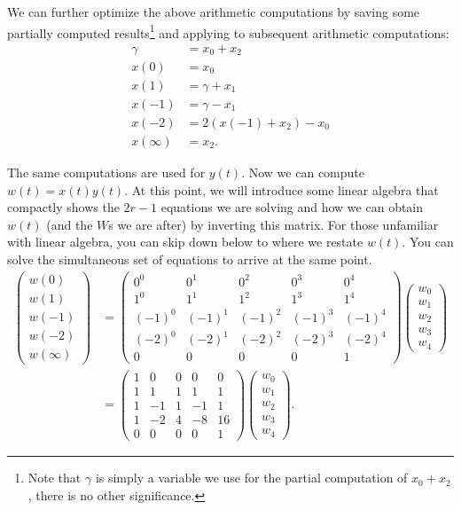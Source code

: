 \documentclass[psamsfonts,reqno]{amsart}
\theoremstyle{definition}
\theoremstyle{remark}
\numberwithin{equation}{section}
\begin{document}
We can further optimize the above arithmetic computations by saving some partially computed results\footnote{Note that $\gamma$ is simply a variable we use for the partial computation of $x_0 + x_2$, there is no other significance.} and applying to subsequent arithmetic computations:
\begin{align}
	\gamma &= x_0 + x_2 \label{toom_opt1} \\
	x(0) &= x_0 \label{toom_opt2} \\
	x(1) &= \gamma + x_1 \label{toom_opt3} \\
	x(-1) &= \gamma - x_1 \label{toom_opt4} \\
	x(-2) &= 2(x(-1) + x_2) - x_0 \label{toom_opt5} \\
	x(\infty) &= x_2. \label{toom_opt6}
\end{align}

The same computations are used for $y(t)$. Now we can compute $w(t) = x(t)y(t)$. At this point, we will introduce some linear algebra that compactly shows the $2r-1$ equations we are solving and how we can obtain $w(t)$ (and the $W$s we are after) by inverting this matrix. For those unfamiliar with linear algebra, you can skip down below to where we restate $w(t)$. You can solve the simultaneous set of equations to arrive at the same point.
\begin{align*}
	\begin{pmatrix}
		w(0) \\ 
		w(1) \\
		w(-1) \\
		w(-2) \\
		w(\infty)
	\end{pmatrix}
	&=
	\begin{pmatrix}
		0^0 & 0^1 & 0^2 & 0^3 & 0^4 \\
		1^0 & 1^1 & 1^2 & 1^3 & 1^4 \\
		(-1)^0 & (-1)^1 & (-1)^2 & (-1)^3 & (-1)^4 \\
		(-2)^0 & (-2)^1 & (-2)^2 & (-2)^3 & (-2)^4 \\
		0 & 0 & 0 & 0 & 1
	\end{pmatrix}
	\begin{pmatrix}
		w_0 \\
		w_1 \\
		w_2 \\
		w_3 \\
		w_4
	\end{pmatrix}
	\\
	&=
	\begin{pmatrix}
		1 & 0 & 0 & 0 & 0 \\
		1 & 1 & 1 & 1 & 1 \\
		1 & -1 & 1 & -1 & 1 \\
		1 & -2 & 4 & -8 & 16 \\
		0 & 0 & 0 & 0 & 1
	\end{pmatrix}
	\begin{pmatrix}
		w_0 \\
		w_1 \\
		w_2 \\
		w_3 \\
		w_4		
	\end{pmatrix}
	.
\end{align*}
\end{document}

